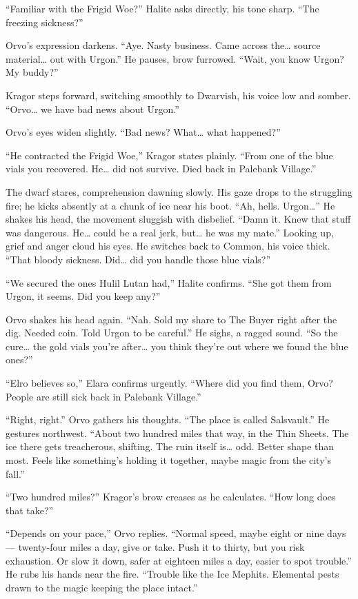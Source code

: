 \documentclass[
  letterpaper,12pt,twoside,twocolumn,openany,
  nodeprecatedcode,bg=full]{dndbook}
\begin{document}
``Familiar with the Frigid Woe?'' Halite asks directly, his tone sharp.
``The freezing sickness?''

Orvo's expression darkens. ``Aye. Nasty business. Came across
the\ldots{} source material\ldots{} out with Urgon.'' He pauses, brow
furrowed. ``Wait, you know Urgon? My buddy?''

Kragor steps forward, switching smoothly to Dwarvish, his voice low and
somber. ``Orvo\ldots{} we have bad news about Urgon.''

Orvo's eyes widen slightly. ``Bad news? What\ldots{} what happened?''

``He contracted the Frigid Woe,'' Kragor states plainly. ``From one of
the blue vials you recovered. He\ldots{} did not survive. Died back in
Palebank Village.''

The dwarf stares, comprehension dawning slowly. His gaze drops to the
struggling fire; he kicks absently at a chunk of ice near his boot.
``Ah, hells. Urgon\ldots{}'' He shakes his head, the movement sluggish
with disbelief. ``Damn it. Knew that stuff was dangerous. He\ldots{}
could be a real jerk, but\ldots{} he was my mate.'' Looking up, grief
and anger cloud his eyes. He switches back to Common, his voice thick.
``That bloody sickness. Did\ldots{} did you handle those blue vials?''

``We secured the ones Hulil Lutan had,'' Halite confirms. ``She got them
from Urgon, it seems. Did you keep any?''

Orvo shakes his head again. ``Nah. Sold my share to The Buyer right
after the dig. Needed coin. Told Urgon to be careful.'' He sighs, a
ragged sound. ``So the cure\ldots{} the gold vials you're after\ldots{}
you think they're out where we found the blue ones?''

``Elro believes so,'' Elara confirms urgently. ``Where did you find
them, Orvo? People are still sick back in Palebank Village.''

``Right, right.'' Orvo gathers his thoughts. ``The place is called
Salsvault.'' He gestures northwest. ``About two hundred miles that way,
in the Thin Sheets. The ice there gets treacherous, shifting. The ruin
itself is\ldots{} odd. Better shape than most. Feels like something's
holding it together, maybe magic from the city's fall.''

``Two hundred miles?'' Kragor's brow creases as he calculates. ``How
long does that take?''

``Depends on your pace,'' Orvo replies. ``Normal speed, maybe eight or
nine days--- twenty-four miles a day, give or take. Push it to thirty,
but you risk exhaustion. Or slow it down, safer at eighteen miles a day,
easier to spot trouble.'' He rubs his hands near the fire. ``Trouble
like the Ice Mephits. Elemental pests drawn to the magic keeping the
place intact.''
\end{document}
